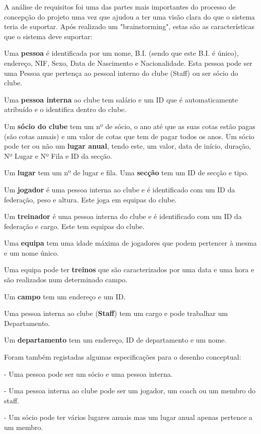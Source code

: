 \documentclass[pdftex,12pt,a4paper]{report}
\begin{document}
A análise de requisitos foi uma das partes mais importantes do processo de concepção do projeto uma vez que ajudou a ter uma visão clara do que o sistema teria de suportar. Após realizado um "brainstorming", estas são as características que o sistema deve suportar:

Uma \textbf{pessoa} é identificada por um nome, B.I. (sendo que este B.I. é único), endereço, NIF, Sexo, Data de Nascimento e Nacionalidade. Esta pessoa pode ser uma Pessoa que pertença ao pessoal interno do clube (Staff) ou ser sócio do clube. 

Uma \textbf{pessoa interna} ao clube tem salário e um ID que é automaticamente atribuído e o identifica dentro do clube.

Um \textbf{sócio do clube} tem um nº de sócio, o ano até que as suas cotas estão pagas (são cotas anuais) e um valor de cotas que tem de pagar todos os anos. Um sócio pode ter ou não um \textbf{lugar anual}, tendo este, um valor, data de início, duração, Nº Lugar e Nº Fila e ID da secção.

Um \textbf{lugar} tem um nº de lugar e fila. Uma \textbf{secção} tem um ID de secção e tipo. 

Um \textbf{jogador} é uma pessoa interna ao clube e é identificado com um ID da federação, peso e altura. Este joga em equipas do clube.

Um \textbf{treinador} é uma pessoa interna do clube e é identificado com um ID da federação e cargo. Este tem equipas do clube.

Uma \textbf{equipa} tem uma idade máxima de jogadores que podem pertencer à mesma e um nome único.

Uma equipa pode ter \textbf{treinos} que são caracterizados por uma data e uma hora e são realizados num determinado campo.

Um \textbf{campo} tem um endereço e um ID.

Uma pessoa interna ao clube (\textbf{Staff}) tem um cargo e pode trabalhar um Departamento.

Um \textbf{departamento} tem um endereço, ID de departamento e um nome.

\newpage

Foram também registadas algumas especificações para o desenho conceptual:

- Uma pessoa pode ser um sócio e uma pessoa interna.

- Uma pessoa interna ao clube pode ser um jogador, um coach ou um membro do staff.

- Um sócio pode ter vários lugares anuais mas um lugar anual apenas pertence a um membro.
\end{document}

